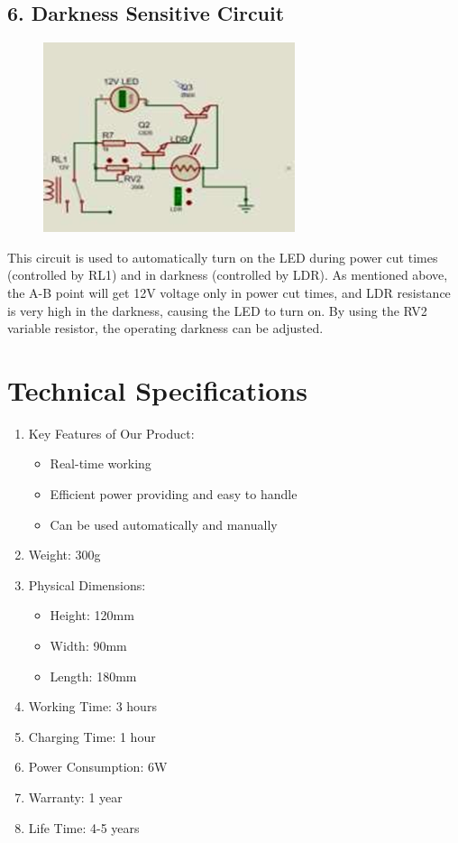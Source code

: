 \documentclass[twocolumn]{article}
\begin{document}
\subsection*{6. Darkness Sensitive Circuit}

\begin{figure}[h]
    \centering
    \includegraphics{14.png}
    \label{fig:enter-label}
\end{figure}

This circuit is used to automatically turn on the LED during power cut times (controlled by RL1) and in darkness (controlled by LDR). As mentioned above, the A-B point will get 12V voltage only in power cut times, and LDR resistance is very high in the darkness, causing the LED to turn on. By using the RV2 variable resistor, the operating darkness can be adjusted.

\section*{Technical Specifications}
\begin{enumerate}
    \item Key Features of Our Product:
    \begin{itemize}
        \item Real-time working
        \item Efficient power providing and easy to handle
        \item Can be used automatically and manually
    \end{itemize}
    \item Weight: 300g
    \item Physical Dimensions:
    \begin{itemize}
        \item Height: 120mm
        \item Width: 90mm
        \item Length: 180mm
    \end{itemize}
    \item Working Time: 3 hours
    \item Charging Time: 1 hour
    \item Power Consumption: 6W
    \item Warranty: 1 year
    \item Life Time: 4-5 years
\end{enumerate}
\end{document}
